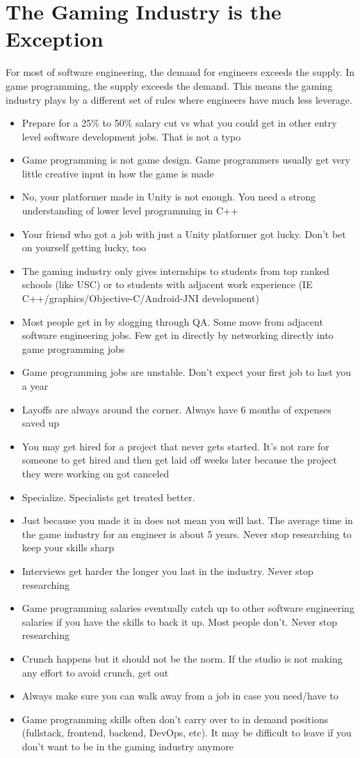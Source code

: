 \documentclass[12pt]{article}
\begin{document}
\section{The Gaming Industry is the Exception}
For most of software engineering, the demand for engineers exceeds the supply. In game programming, the supply exceeds the demand. This means the gaming industry plays by a different set of rules where engineers have much less leverage.
\begin{itemize}
\item Prepare for a 25\% to 50\% salary cut vs what you could get in other entry level software development jobs. That is not a typo
\item Game programming is not game design. Game programmers usually get very little creative input in how the game is made
\item No, your platformer made in Unity is not enough. You need a strong understanding of lower level programming in C++
\item Your friend who got a job with just a Unity platformer got lucky. Don't bet on yourself getting lucky, too
\item The gaming industry only gives internships to students from top ranked schools (like USC) or to students with adjacent work experience (IE C++/graphics/Objective-C/Android-JNI development)
\item Most people get in by slogging through QA. Some move from adjacent software engineering jobs. Few get in directly by networking directly into game programming jobs
\item Game programming jobs are unstable. Don't expect your first job to last you a year
\item Layoffs are always around the corner. Always have 6 months of expenses saved up
\item You may get hired for a project that never gets started. It's not rare for someone to get hired and then get laid off weeks later because the project they were working on got canceled
\item Specialize. Specialists get treated better.
\item Just because you made it in does not mean you will last. The average time in the game industry for an engineer is about 5 years. Never stop researching to keep your skills sharp
\item Interviews get harder the longer you last in the industry. Never stop researching
\item Game programming salaries eventually catch up to other software engineering salaries if you have the skills to back it up. Most people don't. Never stop researching
\item Crunch happens but it should not be the norm. If the studio is not making any effort to avoid crunch, get out 
\item Always make sure you can walk away from a job in case you need/have to
\item Game programming skills often don't carry over to in demand positions (fullstack, frontend, backend, DevOps, etc). It may be difficult to leave if you don't want to be in the gaming industry anymore
\end{itemize}
\end{document}
